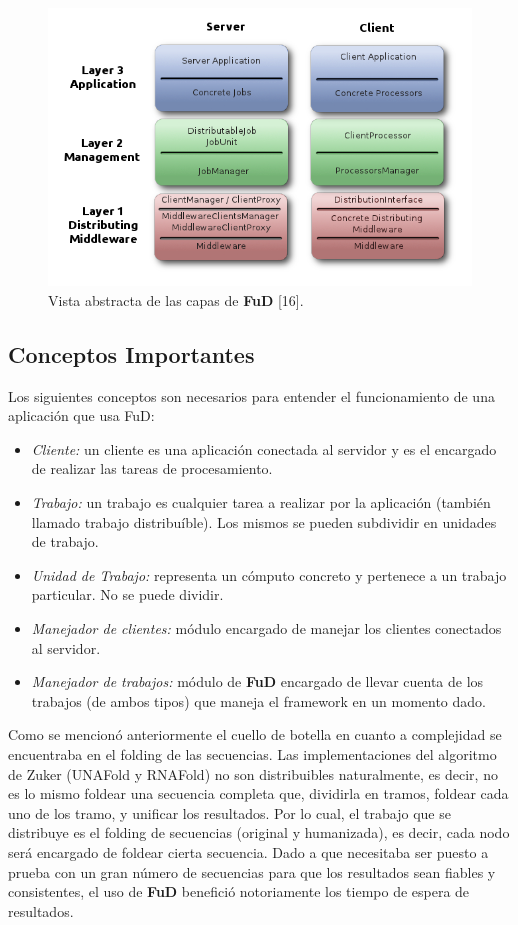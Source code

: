 \begin{figure}[h!] \hspace{.60cm}
    \includegraphics[scale=.55]{image/AbstractLayers.png}
    \caption{Vista abstracta de las capas de \textbf{FuD} [16].} 
    \label{disenioFud}
\end{figure}

\subsection{Conceptos Importantes}
Los siguientes conceptos son necesarios para entender el funcionamiento de una aplicación que usa FuD:
\begin{itemize}
	\item \emph{Cliente:} un cliente es una aplicación conectada al servidor y es el encargado de realizar las tareas de procesamiento.
 	\item \emph{Trabajo:} un trabajo es cualquier tarea a realizar por la aplicación (también llamado trabajo distribuíble). Los mismos se
 						  pueden subdividir en unidades de trabajo.
 	\item \emph{Unidad de Trabajo:} representa un cómputo concreto y pertenece a un trabajo particular. No se puede dividir.
 	\item \emph{Manejador de clientes:} módulo encargado de manejar los clientes conectados al servidor.
 	\item \emph{Manejador de trabajos:} módulo de \textbf{FuD} encargado de llevar cuenta de los trabajos (de ambos tipos) que maneja el
 										framework en un momento dado.
 \end{itemize}

\par Como se mencionó anteriormente el cuello de botella en cuanto a complejidad se encuentraba en el folding de las secuencias. Las implementaciones del algoritmo de Zuker (UNAFold y RNAFold) no son distribuibles naturalmente, es decir, no es lo mismo foldear una secuencia completa que, dividirla en tramos, foldear cada uno de los tramo, y unificar los resultados. Por lo cual, el trabajo que se distribuye es el folding de secuencias (original y humanizada), es decir, cada nodo será encargado de foldear cierta secuencia. 
Dado a que \remo necesitaba ser puesto a prueba con un gran número de secuencias para que los resultados sean fiables y consistentes, el uso de \textbf{FuD} benefició notoriamente los tiempo de espera de resultados.

